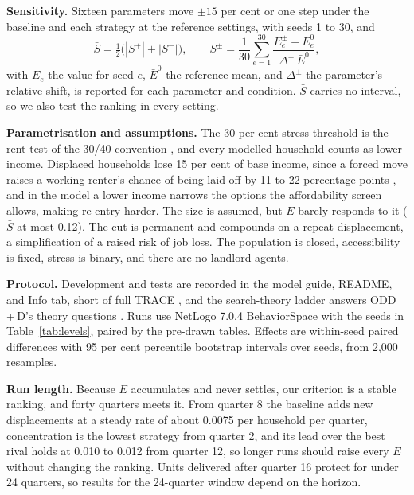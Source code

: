 \documentclass[10pt,a4paper]{article}
\begin{document}
\textbf{Sensitivity.} Sixteen parameters move $\pm15$ per cent or one step under the baseline and each strategy at the reference settings, with seeds 1 to 30, and
\begin{equation}
\bar S=\tfrac{1}{2}\big(|S^{+}|+|S^{-}|\big),\qquad
S^{\pm}=\frac{1}{30}\sum_{e=1}^{30}\frac{E^{\pm}_e-E^{0}_e}{\Delta^{\pm}\,\bar E^{0}},
\end{equation}
with $E_e$ the value for seed $e$, $\bar E^{0}$ the reference mean, and $\Delta^{\pm}$ the parameter's relative shift, is reported for each parameter and condition. $\bar S$ carries no interval, so we also test the ranking in every setting.

\textbf{Parametrisation and assumptions.} The 30 per cent stress threshold is the rent test of the 30/40 convention \citep{25}, and every modelled household counts as lower-income. Displaced households lose 15 per cent of base income, since a forced move raises a working renter's chance of being laid off by 11 to 22 percentage points \citep{12}, and in the model a lower income narrows the options the affordability screen allows, making re-entry harder. The size is assumed, but $E$ barely responds to it ($\bar S$ at most 0.12). The cut is permanent and compounds on a repeat displacement, a simplification of a raised risk of job loss. The population is closed, accessibility is fixed, stress is binary, and there are no landlord agents.

\textbf{Protocol.} Development and tests are recorded in the model guide, README, and Info tab, short of full TRACE \citep{32}, and the search-theory ladder answers ODD\,+\,D's theory questions \citep{33}. Runs use NetLogo 7.0.4 BehaviorSpace with the seeds in Table~\ref{tab:levels}, paired by the pre-drawn tables. Effects are within-seed paired differences with 95 per cent percentile bootstrap intervals over seeds, from 2,000 resamples.

\textbf{Run length.} Because $E$ accumulates and never settles, our criterion is a stable ranking, and forty quarters meets it. From quarter 8 the baseline adds new displacements at a steady rate of about 0.0075 per household per quarter, concentration is the lowest strategy from quarter 2, and its lead over the best rival holds at 0.010 to 0.012 from quarter 12, so longer runs should raise every $E$ without changing the ranking. Units delivered after quarter 16 protect for under 24 quarters, so results for the 24-quarter window depend on the horizon.


\end{document}
